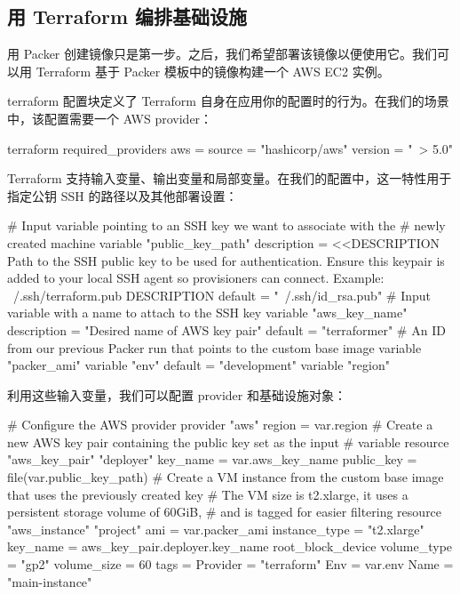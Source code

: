 \subsection{用 Terraform 编排基础设施}

\label{idx:980}
\label{idx:981}
用 Packer 创建镜像只是第一步。之后，我们希望部署该镜像以便使用它。我们可以用 Terraform 基于 Packer 模板中的镜像构建一个 AWS EC2 实例。

terraform 配置块定义了 Terraform 自身在应用你的配置时的行为。在我们的场景中，该配置需要一个 AWS provider：

\begin{codebox}[text]
terraform {
  required_providers {
    aws = {
      source = "hashicorp/aws"
      version = "~> 5.0"
    }
  }
}
\end{codebox}

\label{idx:982}
Terraform 支持输入变量、输出变量和局部变量。在我们的配置中，这一特性用于指定公钥 SSH 的路径以及其他部署设置：

\begin{codebox}[text]
# Input variable pointing to an SSH key we want to associate with the
# newly created machine
variable "public_key_path" {
  description = <<DESCRIPTION
Path to the SSH public key to be used for authentication.
Ensure this keypair is added to your local SSH agent so provisioners can
connect.
Example: ~/.ssh/terraform.pub
DESCRIPTION
  default = "~/.ssh/id_rsa.pub"
}
# Input variable with a name to attach to the SSH key
variable "aws_key_name" {
  description = "Desired name of AWS key pair"
  default = "terraformer"
}
# An ID from our previous Packer run that points to the custom base image
variable "packer_ami" {
}
variable "env" {
  default = "development"
}
variable "region" {
}
\end{codebox}

\label{idx:983}
利用这些输入变量，我们可以配置 provider 和基础设施对象：

\begin{codebox}[text]
# Configure the AWS provider
provider "aws" {
  region  = var.region
}
# Create a new AWS key pair containing the public key set as the input
# variable
resource "aws_key_pair" "deployer" {
  key_name = var.aws_key_name
  public_key = file(var.public_key_path)
}
# Create a VM instance from the custom base image that uses the previously created key
# The VM size is t2.xlarge, it uses a persistent storage volume of 60GiB,
# and is tagged for easier filtering
resource "aws_instance" "project" {
  ami = var.packer_ami
  instance_type = "t2.xlarge"
  key_name = aws_key_pair.deployer.key_name
  root_block_device {
    volume_type = "gp2"
    volume_size = 60
  }
  tags = {
    Provider = "terraform"
    Env = var.env
    Name = "main-instance"
  }
}
\end{codebox}

